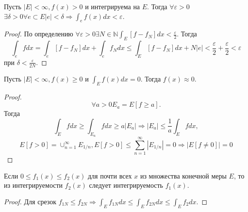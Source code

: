 \documentclass[11pt]{article}
\newcounter{th}\setcounter{th}{0}
\def\th{\par\smallskip\refstepcounter{th}\textbf{\arabic{th}}}
\newtheorem*{Theorem}{Теорема \th}
\begin{document}
\begin{Theorem}
Пусть $|E| < \infty, f(x) > 0$ и интегрируема на $E$. Тогда $\forall \varepsilon > 0$
$\exists \delta > 0 \forall e \subset E |e| < \delta \Rightarrow \int_ef(x)dx < \varepsilon$.
\end{Theorem}
\begin{proof}
По определению $\forall \varepsilon > 0 \exists N \in \mathbb{N} \int_E[f - f_N]dx < \frac{\varepsilon}2$.
Тогда
\begin{equation}
\int_efdx = \int_e[f - f_N]dx + \int_ef_Ndx \leq \int_E[f - f_N]dx + N|e| < \frac{\varepsilon}2 +
\frac{\varepsilon}2 < \varepsilon
\end{equation}
при $\delta < \frac{\varepsilon}{2N}$.
\end{proof}
\begin{Theorem}
Пусть $|E| < \infty, f(x) \geq 0$ и $\int_Ef(x)dx = 0$. Тогда $f(x) \approx 0$.
\end{Theorem}
\begin{proof}
\begin{equation}
\forall a > 0 E_a = E[f \geq a].
\end{equation}
Тогда
\begin{equation}
\int_Efdx \geq \int_{E_a}fdx \geq a|E_a| \Rightarrow |E_a| \leq \frac1a\int_Efdx,
\end{equation}
\begin{equation}
E[f > 0] = \cup_{n = 1}^{\infty}E_{1/n}, E[f > 0] \leq \sum_{n = 1}^{\infty}|E_{1/n}| = 0 \Rightarrow
|E[f \neq 0]| = 0
\end{equation}
\end{proof}
\begin{Theorem}
Если $0 \leq f_1(x) \leq f_2(x)$ для почти всех $x$ из множества конечной меры $E$, то
из интегрируемости $f_2(x)$ следует интегрируемость $f_1(x)$.
\end{Theorem}
\begin{proof}
Для срезок $f_{1N} \leq f_{2N} \Rightarrow \int_Ef_{1N}dx \leq \int_Ef_{2N}dx \leq \int_E f_2dx$.
\end{proof}
\end{document}
